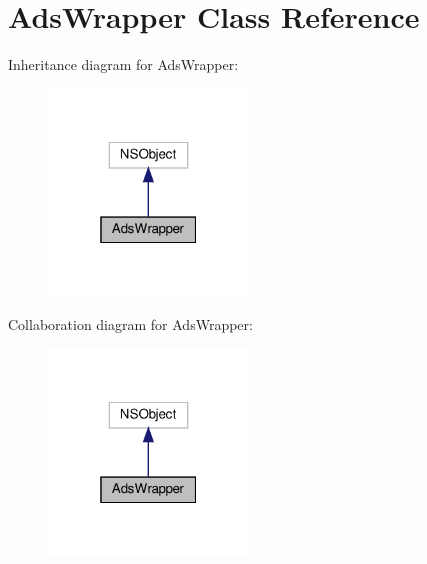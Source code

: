 \hypertarget{interfaceAdsWrapper}{}\section{Ads\+Wrapper Class Reference}
\label{interfaceAdsWrapper}


Inheritance diagram for Ads\+Wrapper\+:
\nopagebreak
\begin{figure}[H]
\begin{center}
\leavevmode
\includegraphics[width=151pt]{interfaceAdsWrapper__inherit__graph}
\end{center}
\end{figure}


Collaboration diagram for Ads\+Wrapper\+:
\nopagebreak
\begin{figure}[H]
\begin{center}
\leavevmode
\includegraphics[width=151pt]{interfaceAdsWrapper__coll__graph}
\end{center}
\end{figure}
